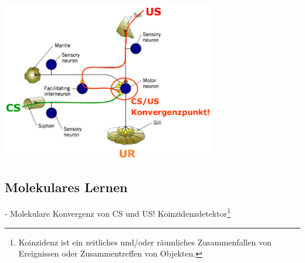 \begin{center}
	\includegraphics[width=0.7\textwidth]{lectures/160608/pix/cs_us_konvergenz.png}
\end{center}

\subsection{Molekulares Lernen}
 - Molekulare Konvergenz von CS und US! Koinzidenzdetektor\footnote{Koinzidenz ist ein zeitliches und/oder räumliches Zusammenfallen von Ereignissen oder Zusammentreffen von Objekten.}